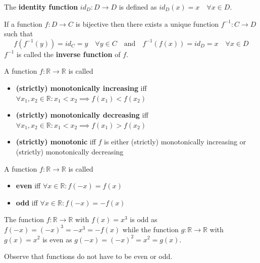 \begin{definition}
The \textbf{identity function} $id_D: D \to D$ is defined as $id_D(x) = x \quad \forall x \in D$.
\end{definition}

\begin{definition}
If a function $f: D \to C$ is bijective then there exists a unique function $f^{-1}: C \to D$ such that
$$f(f^{-1}(y)) = id_C = y \quad \forall y \in C \quad \text{and} \quad f^{-1}(f(x)) = id_D = x \quad \forall x \in D$$
$f^{-1}$ is called the \textbf{inverse function} of $f$.
\end{definition}

\begin{definition}
    A function  $f: \mathbb{R} \to \mathbb{R}$ is called 
    \begin{itemize}
        \item \textbf{(strictly) monotonically increasing} iff $\forall x_1, x_2 \in \mathbb{R} : x_1 < x_2 \implies f(x_1) < f(x_2)$
        \item \textbf{(strictly) monotonically decreasing} iff $\forall x_1, x_2 \in \mathbb{R} : x_1 < x_2 \implies f(x_1) > f(x_2)$
        \item \textbf{(strictly) monotonic} iff $f$ is either (strictly) monotonically increasing or (strictly) monotonically decreasing
    \end{itemize}
\end{definition}

\begin{definition}
    A function $f: \mathbb{R} \to \mathbb{R}$ is called 
    \begin{itemize}
        \item \textbf{even} iff $\forall x \in \mathbb{R} : f(-x) = f(x)$
        \item \textbf{odd} iff $\forall x \in \mathbb{R} : f(-x) = -f(x)$
    \end{itemize}
\end{definition}

\begin{example}
    The function $f: \mathbb{R} \to \mathbb{R}$ with $f(x) = x^3$ is odd as $f(-x) = (-x)^3 = -x^3 = -f(x)$ while the function $g: \mathbb{R} \to \mathbb{R}$ with $g(x) = x^2$ is even as $g(-x) = (-x)^2 = x^2 = g(x)$.
\end{example}

\begin{remark}
    Observe that functions do not have to be even or odd.
\end{remark}

